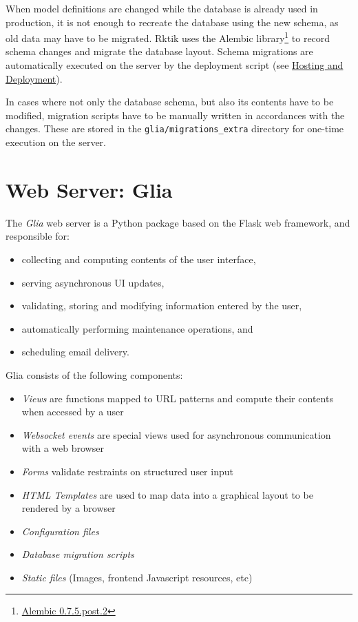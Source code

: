 When model definitions are changed while the database is already used in
production, it is not enough to recreate the database using the new
schema, as old data may have to be migrated. Rktik uses the Alembic
library\footnote{\href{https://pypi.python.org/pypi/alembic/0.7.5.post2}{Alembic
  0.7.5.post.2}} to record schema changes and migrate the database
layout. Schema migrations are automatically executed on the server by
the deployment script (see \hyperref[hosting-and-deployment]{Hosting and
Deployment}).

In cases where not only the database schema, but also its contents have
to be modified, migration scripts have to be manually written in
accordances with the changes. These are stored in the
\texttt{glia/migrations\_extra} directory for one-time execution on the
server.

\section{Web Server: Glia}\label{web-server-glia}

The \emph{Glia} web server is a Python package based on the Flask web
framework, and responsible for:

\begin{itemize}
\tightlist
\item
  collecting and computing contents of the user interface,
\item
  serving asynchronous UI updates,
\item
  validating, storing and modifying information entered by the user,
\item
  automatically performing maintenance operations, and
\item
  scheduling email delivery.
\end{itemize}

Glia consists of the following components:

\begin{itemize}
\tightlist
\item
  \emph{Views} are functions mapped to URL patterns and compute their
  contents when accessed by a user
\item
  \emph{Websocket events} are special views used for asynchronous
  communication with a web browser
\item
  \emph{Forms} validate restraints on structured user input
\item
  \emph{HTML Templates} are used to map data into a graphical layout to
  be rendered by a browser
\item
  \emph{Configuration files}
\item
  \emph{Database migration scripts}
\item
  \emph{Static files} (Images, frontend Javascript resources, etc)
\end{itemize}

